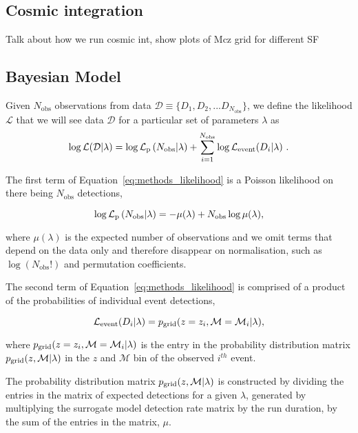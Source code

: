 \documentclass[twocolumn]{aastex631}
\newcommand{\Lmain}{\ensuremath{\mathcal{L}(\mathcal{D}|\lambda)}\xspace}
\newcommand{\Lp}{\ensuremath{\mathcal{L}_{\rm p}}\xspace}
\newcommand{\Le}{\ensuremath{\mathcal{L}_{\rm event}}\xspace}
\newcommand{\pg}{\ensuremath{p_{\rm grid}}\xspace}
\begin{document}
\subsection{Cosmic integration}
Talk about how we run cosmic int,
show plots of Mcz grid for different SF

\subsection{Bayesian Model}
Given $N_{\mathrm{obs}}$ observations from data  $\mathcal{D} \equiv \{D_1, D_2, ... D_{N_{\mathrm{obs}}}\}$, we define the likelihood $\mathcal{L}$ that we will see data $\mathcal{D}$ for a particular set of parameters $\lambda$ as
\begin{equation}
  \log{\Lmain} = \log{\Lp\left(N_{\mathrm{obs}}|\lambda\right)} +
  \sum_{i=1}^{N_\mathrm{obs}} \log{\Le(D_i|\lambda)}\ .
  \label{eq:methods_likelihood}
\end{equation}

\bigskip
The first term of Equation~\ref{eq:methods_likelihood} is a Poisson likelihood on there being $N_\mathrm{obs}$ detections,

\begin{equation}
  \log{ \Lp\left(N_{\mathrm{obs}}|\lambda\right)} = - \mu(\lambda) + N_{\mathrm{obs}}\log\mu(\lambda) ,
  \label{eq:methods_likelihood_term1}
\end{equation}

\bigskip\noindent
where $\mu(\lambda)$ is the expected number of observations and we omit terms that depend on the data only and therefore disappear on normalisation, such as $\log(N_{\mathrm{obs}}!)$ and permutation coefficients.

The second term of Equation~\ref{eq:methods_likelihood} is comprised of a product of the probabilities of individual event detections,

\begin{equation}
  \Le(D_i|\lambda) = \pg(z=z_i,\mathcal{M}=\mathcal{M}_{i}|\lambda),
  \label{eq:methods_likelihood_term2}
\end{equation}

\bigskip\noindent
where $\pg(z=z_i,\mathcal{M}=\mathcal{M}_{i}|\lambda)$ is the entry in the probability distribution matrix $\pg(z,\mathcal{M}|\lambda)$ in the $z$ and $\mathcal{M}$ bin of the observed $i^{th}$ event.

The probability distribution matrix $\pg(z,\mathcal{M}|\lambda)$ is constructed by dividing the entries in the matrix of expected detections for a given $\lambda$, generated by multiplying the surrogate model detection rate matrix by the run duration, by the sum of the entries in the matrix, $\mu$.
\end{document}
